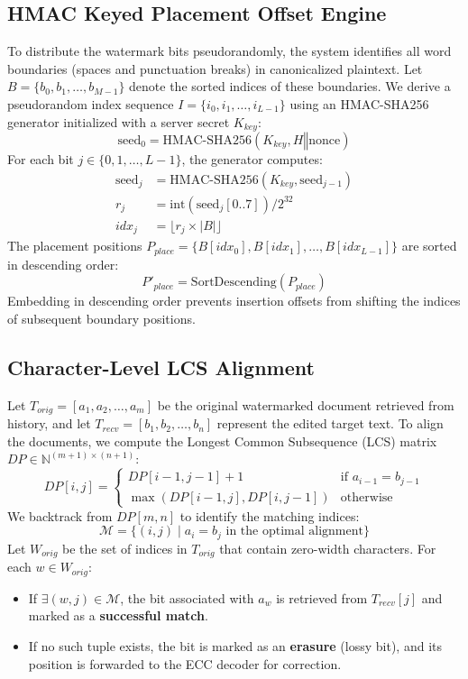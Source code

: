 \documentclass[conference]{IEEEtran}
\begin{document}
\subsection{HMAC Keyed Placement Offset Engine}
To distribute the watermark bits pseudorandomly, the system identifies all word boundaries (spaces and punctuation breaks) in canonicalized plaintext. Let $B = \{b_0, b_1, \dots, b_{M-1}\}$ denote the sorted indices of these boundaries.
We derive a pseudorandom index sequence $I = \{i_0, i_1, \dots, i_{L-1}\}$ using an HMAC-SHA256 generator initialized with a server secret $K_{key}$:
\begin{equation}
\text{seed}_0 = \text{HMAC-SHA256}(K_{key}, H \mathbin{\Vert} \text{nonce})
\end{equation}
For each bit $j \in \{0, 1, \dots, L-1\}$, the generator computes:
\begin{align}
\text{seed}_{j} &= \text{HMAC-SHA256}(K_{key}, \text{seed}_{j-1}) \\
r_j &= \text{int}(\text{seed}_{j}[0..7]) / 2^{32} \\
idx_j &= \lfloor r_j \times |B| \rfloor
\end{align}
The placement positions $P_{place} = \{B[idx_0], B[idx_1], \dots, B[idx_{L-1}]\}$ are sorted in descending order:
\begin{equation}
P'_{place} = \text{SortDescending}(P_{place})
\end{equation}
Embedding in descending order prevents insertion offsets from shifting the indices of subsequent boundary positions.

\subsection{Character-Level LCS Alignment}
Let $T_{orig} = [a_1, a_2, \dots, a_m]$ be the original watermarked document retrieved from history, and let $T_{recv} = [b_1, b_2, \dots, b_n]$ represent the edited target text. To align the documents, we compute the Longest Common Subsequence (LCS) matrix $DP \in \mathbb{N}^{(m+1) \times (n+1)}$:
\begin{equation}
DP[i, j] = \begin{cases}
DP[i-1, j-1] + 1 & \text{if } a_{i-1} = b_{j-1} \\
\max(DP[i-1, j], DP[i, j-1]) & \text{otherwise}
\end{cases}
\end{equation}
We backtrack from $DP[m, n]$ to identify the matching indices:
\begin{equation}
\mathcal{M} = \{ (i, j) \mid a_i = b_j \text{ in the optimal alignment} \}
\end{equation}
Let $W_{orig}$ be the set of indices in $T_{orig}$ that contain zero-width characters. For each $w \in W_{orig}$:
\begin{itemize}
    \item If $\exists (w, j) \in \mathcal{M}$, the bit associated with $a_w$ is retrieved from $T_{recv}[j]$ and marked as a \textbf{successful match}.
    \item If no such tuple exists, the bit is marked as an \textbf{erasure} (lossy bit), and its position is forwarded to the ECC decoder for correction.
\end{itemize}
\end{document}
